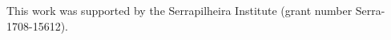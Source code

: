 \documentclass[sigplan,protrusion=true,expansion,screen]{acmart}
\begin{document}
\maketitle








\appendix


\begin{acks}
This work was supported by the Serrapilheira Institute (grant number
Serra-1708-15612).
\end{acks}

\balance


\end{document}
